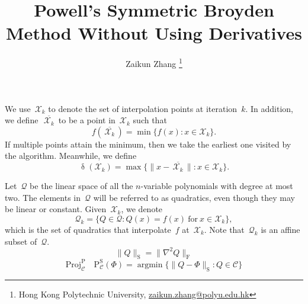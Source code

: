 \documentclass[11pt,a4paper,draft]{article}  %
\title{Powell's Symmetric Broyden Method Without Using Derivatives}
\date{\DTMnow}
\author{Zaikun Zhang
    \thanks{Hong Kong Polytechnic University, \url{zaikun.zhang@polyu.edu.hk}}
}
\theoremstyle{definition}
\numberwithin{equation}{section}
\newcommand{\mbar}[1]{\,\overline{\!{#1}\!}\,} %
\newcommand{\xopt}{\mbar}
\DeclareMathOperator{\xdist}{\updelta}
\DeclareMathOperator*{\argmin}{argmin}
\newcommand{\Int}{\mathcal{X}}
\newcommand{\Qua}{\mathcal{Q}}
\newcommand{\sss}[1]{{\scriptscriptstyle{#1}}}
\newcommand{\new}{{\sss{+}}}
\newcommand{\fro}{{\scriptscriptstyle{\textrm{F}}}}
\newcommand{\sob}{{\scriptscriptstyle{\textrm{S}}}}
\newcommand{\pow}{{\scriptscriptstyle{\textrm{P}}}}
\newcommand{\Proj}{\mathrm{Proj}}
\newcommand{\Projs}{\mathrm{P}^\sob}
\begin{document}
\maketitle



We use~$\Int_k$ to denote the set of interpolation points at iteration~$k$.
In addition, we define~$\xopt{\Int_k}$ to be a point in~$\Int_k$ such that
\begin{equation}
    \label{eq:xopt}
    f(\xopt{\Int_k}) = \min\{f(x) \mathrel{:} x\in \Int_k\}.
\end{equation}
If multiple points attain the minimum, then we take the earliest one visited by the algorithm.
Meanwhile, we define
\begin{equation}
    \label{eq:xdist}
    \xdist(\Int_k) = \max\{\|x-\xopt{\Int_k}\| \mathrel{:} x\in \Int_k\}.
\end{equation}

Let~$\Qua$ be the linear space of all the $n$-variable polynomials with degree at most two. The
elements in~$\Qua$ will be referred to as quadratics, even though they may be linear or constant.
Given~$\Int_k$, we denote
\begin{equation}
    \label{eq:quak}
    \Qua_k = \{Q\in\Qua \mathrel{:} Q(x) = f(x)~\text{for}~x\in\Int_k\},
\end{equation}
which is the set of quadratics that interpolate~$f$ at~$\Int_k$. Note that~$\Qua_k$ is an affine
subset of~$\Qua$.
\begin{equation}
    \label{eq:snorm}
    \|Q\|_\sob = \|\nabla^2 Q\|_\fro
\end{equation}
\begin{equation*}
    \Proj_\mathcal{C}^\pow \quad
    \Projs_{\mathcal{C}}(\Phi) = \argmin\{\|Q-\Phi\|_\sob \mathrel{:} Q\in\mathcal{C}\}
\end{equation*}
\end{document}

